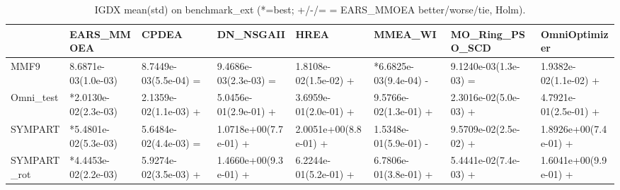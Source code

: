 \begin{table}[t]
\centering
\caption{IGDX mean(std) on benchmark_ext (*=best; +/-/= = EARS_MMOEA better/worse/tie, Holm).}
\label{tab:benchmark_ext_IGDX}
\begin{tabular}{llllllll}
\toprule
 & EARS\_MMOEA & CPDEA & DN\_NSGAII & HREA & MMEA\_WI & MO\_Ring\_PSO\_SCD & OmniOptimizer \\
\midrule
MMF9 & 8.6871e-03(1.0e-03) & 8.7449e-03(5.5e-04) = & 9.4686e-03(2.3e-03) = & 1.8108e-02(1.5e-02) + & *6.6825e-03(9.4e-04) - & 9.1240e-03(1.3e-03) = & 1.9382e-02(1.1e-02) + \\
Omni\_test & *2.0130e-02(2.3e-03) & 2.1359e-02(1.1e-03) + & 5.0456e-01(2.9e-01) + & 3.6959e-01(2.0e-01) + & 9.5766e-02(1.3e-01) + & 2.3016e-02(5.0e-03) + & 4.7921e-01(2.5e-01) + \\
SYMPART & *5.4801e-02(5.3e-03) & 5.6484e-02(4.4e-03) = & 1.0718e+00(7.7e-01) + & 2.0051e+00(8.8e-01) + & 1.5348e-01(5.9e-01) - & 9.5709e-02(2.5e-02) + & 1.8926e+00(7.4e-01) + \\
SYMPART\_rot & *4.4453e-02(2.2e-03) & 5.9274e-02(3.5e-03) + & 1.4660e+00(9.3e-01) + & 6.2244e-01(5.2e-01) + & 6.7806e-01(3.8e-01) + & 5.4441e-02(7.4e-03) + & 1.6041e+00(9.9e-01) + \\
\bottomrule
\end{tabular}
\end{table}
